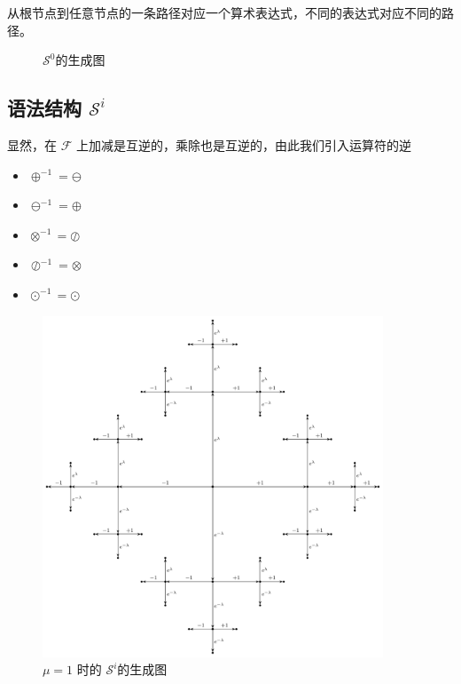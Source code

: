 \documentclass[a4paper,12pt]{article}
\numberwithin{definition}{section}
\numberwithin{lemma}{section}
\numberwithin{proposition}{section}
\numberwithin{theorem}{section}
\numberwithin{grammar}{section}
\numberwithin{program}{section}
\numberwithin{convention}{section}
\numberwithin{corollary}{section}
\begin{document}
从根节点到任意节点的一条路径对应一个算术表达式，不同的表达式对应不同的路径。

\begin{figure}[ht]
\centering
{}
\caption{$\mathcal{S}^0$的生成图}
\end{figure}

\subsection{语法结构 $\mathcal{S}^i$}\label{subsec:syntactical1}

显然，在 $\mathcal{F}$ 上加减是互逆的，乘除也是互逆的，由此我们引入运算符的逆
\begin{itemize}
    \item $\oplus^{-1} = \ominus$
    \item $\ominus^{-1} = \oplus$
    \item $\otimes^{-1} = \oslash$
    \item $\oslash^{-1} = \otimes$
    \item $\odot^{-1} = \odot$
\end{itemize}

\begin{figure}[ht]
\centering
\includegraphics[width=4in]{images/cayley_i}
\caption{$\mu=1$ 时的 $\mathcal{S}^i$的生成图}
\end{figure}
\end{document}
